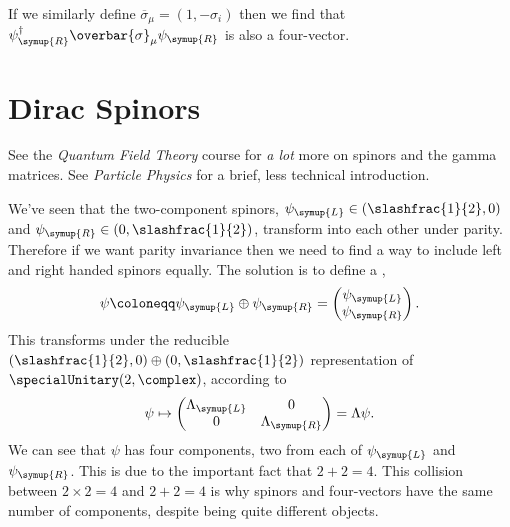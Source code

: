 \documentclass[fleqn]{NotesClass}
\newcommand{\course}[1]{\textit{#1}}
\newcommand{\hermit}{\dagger}
\newcommand{\Left}{\symup{L}}
\newcommand{\Right}{\symup{R}}
\begin{document}
    If we similarly define \(\overbar{\sigma}_\mu = (1, -\sigma_i)\) then we find that \(\psi_{\Right}^\hermit \overbar{\sigma}_\mu \psi_{\Right}\) is also a four-vector.
    
    \section{Dirac Spinors}
    \begin{rmk}
        See the \course{Quantum Field Theory} course for \emph{a lot} more on spinors and the gamma matrices.
        See \course{Particle Physics} for a brief, less technical introduction.
    \end{rmk}
    We've seen that the two-component spinors, \(\psi_{\Left} \in (\slashfrac{1}{2}, 0)\) and \(\psi_{\Right} \in (0, \slashfrac{1}{2})\), transform into each other under parity.
    Therefore if we want parity invariance then we need to find a way to include left and right handed spinors equally.
    The solution is to define a ,
    \begin{equation}
        \psi \coloneqq \psi_{\Left} \oplus \psi_{\Right} = 
        \begin{pmatrix}
            \psi_{\Left} \\ \psi_{\Right}
        \end{pmatrix}
        .
    \end{equation}
    This transforms under the reducible \((\slashfrac{1}{2}, 0) \oplus (0, \slashfrac{1}{2})\) representation of \(\specialUnitary(2, \complex)\), according to
    \begin{equation}
        \psi \mapsto 
        \begin{pmatrix}
            \Lambda_{\Left} & 0\\
            0 & \Lambda_{\Right}
        \end{pmatrix}
        = \Lambda \psi.
    \end{equation}
    We can see that \(\psi\) has four components, two from each of \(\psi_{\Left}\) and \(\psi_{\Right}\).
    This is due to the important fact that \(2 + 2 = 4\).
    This collision between \(2 \times 2 = 4\) and \(2 + 2 = 4\) is why spinors and four-vectors have the same number of components, despite being quite different objects.
    
\end{document}
